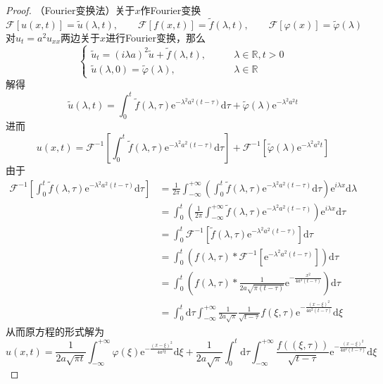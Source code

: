 \documentclass[lang = cn, scheme = chinese, thmcnt = section]{elegantbook}
\newcommand{\R}{\mathbb{R}}            %
\newcommand{\dd}{\mathrm{d}}           %
\newcommand{\ee}[1]{\mathrm{e}^{#1}}   %
\begin{document}
\begin{proof}
	（Fourier变换法）关于$x$作Fourier变换%
	$$
	\mathscr{F}[u(x,t)]=\tilde{u}(\lambda,t),\qquad
	\mathscr{F}[f(x,t)]=\tilde{f}(\lambda,t),\qquad
	\mathscr{F}[\varphi(x)]=\tilde{\varphi}(\lambda) 
	$$
	对$u_t=a^2u_{xx}$两边关于$x$进行Fourier变换，那么
	$$
	\begin{cases}
		\tilde{u}_t=(i\lambda a)^2\tilde{u}+\tilde{f}(\lambda,t),\qquad & \lambda\in\R,t>0\\
		\tilde{u}(\lambda,0)=\tilde{\varphi}(\lambda),\qquad & \lambda\in\R
	\end{cases}
	$$
	解得
	$$
	\tilde{u}(\lambda,t)=
	\int_{0}^{t}\tilde{f}(\lambda,\tau)\ee{-\lambda^2 a^2(t-\tau)}\dd\tau
	+\tilde{\varphi}(\lambda)\ee{-\lambda^2a^2t}
	$$
	进而%
	$$
	u(x,t)=\mathscr{F}^{-1}\left[\int_{0}^{t}\tilde{f}(\lambda,\tau)\ee{-\lambda^2 a^2(t-\tau)}\dd\tau
	\right]+\mathscr{F}^{-1}\left[\tilde{\varphi}(\lambda)\ee{-\lambda^2a^2t}\right]
	$$
	由于
	\begin{align*}
		\mathscr{F}^{-1}\left[\int_{0}^{t}\tilde{f}(\lambda,\tau)\ee{-\lambda^2 a^2(t-\tau)}\dd\tau
		\right]
		& = \frac{1}{2\pi}\int_{-\infty}^{+\infty}\left(\int_{0}^{t}\tilde{f}(\lambda,\tau)\ee{-\lambda^2 a^2(t-\tau)}\dd\tau\right)\ee{i\lambda x}\dd \lambda\\
		& = \int_{0}^{t}\left(\frac{1}{2\pi}\int_{-\infty}^{+\infty}\tilde{f}(\lambda,\tau)\ee{-\lambda^2 a^2(t-\tau)}\right)\ee{i\lambda x}\dd \tau\\
		& = \int_{0}^{t}\mathscr{F}^{-1}\left[\tilde{f}(\lambda,\tau)\ee{-\lambda^2 a^2(t-\tau)}\right]\dd\tau\\
		& = \int_{0}^{t}\left(f(\lambda,\tau)*\mathscr{F}^{-1}\left[\ee{-\lambda^2 a^2(t-\tau)}\right]\right)\dd\tau\\
		& = \int_{0}^{t}\left(f(\lambda,\tau)*\frac{1}{2a\sqrt{\pi(t-\tau)}}\ee{-\frac{x^2}{4a^2(t-\tau)}}\right)\dd\tau\\
		& = \int_{0}^{t}\dd\tau\int_{-\infty}^{+\infty}\frac{1}{2a\sqrt{\pi}}\frac{1}{\sqrt{t-\tau}}f(\xi,\tau)\ee{-\frac{(x-\xi)^2}{4a^2(t-\tau)}}\dd\xi
	\end{align*}
	从而原方程的形式解为%
	$$
	u(x,t)=\frac{1}{2a\sqrt{\pi t}}\int_{-\infty}^{+\infty}\varphi(\xi)\ee{-\frac{(x-\xi)^2}{4a^2t}}\dd\xi
	+\frac{1}{2a\sqrt{\pi}}\int_{0}^{t}\dd\tau\int_{-\infty}^{+\infty}\frac{f((\xi,\tau))}{\sqrt{t-\tau}}\ee{-\frac{(x-\xi)^2}{4a^2(t-\tau)}}\dd\xi
	$$
	

\end{proof}
\end{document}

